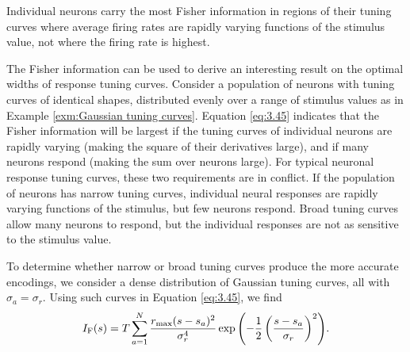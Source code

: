 \begin{rem}
  Individual neurons carry the most Fisher
information in regions of their tuning curves where average firing rates
are rapidly varying functions of the stimulus value, not where the firing
rate is highest.
\end{rem}
\begin{rem}
   The Fisher information can be used to derive an interesting result on the
optimal widths of response tuning curves. Consider a population of neurons with tuning curves of identical shapes, distributed evenly over a
range of stimulus values as in Example \ref{exm:Gaussian tuning curves}. Equation \ref{eq:3.45} indicates that the
Fisher information will be largest if the tuning curves of individual neurons are rapidly varying (making the square of their derivatives large), and
if many neurons respond (making the sum over neurons large). For typical neuronal response tuning curves, these two requirements are in conflict.
If the population of neurons has narrow tuning curves,
individual neural responses are rapidly varying functions of the stimulus,
but few neurons respond. Broad tuning curves allow many neurons to
respond, but the individual responses are not as sensitive to the stimulus
value.
\end{rem}
\begin{exm}
  To determine whether narrow or broad tuning curves produce the
more accurate encodings, we consider a dense distribution of Gaussian
tuning curves, all with $\sigma_a=\sigma_{r}$. Using such curves in
Equation \ref{eq:3.45}, we find
\begin{equation}
  \label{eq:3.46}
  I_{\rm{F}}(s)=T\sum\limits_{a=1}\limits^N
  {\frac{r_{\max}(s-s_{a})^{2}}{\sigma_r^{4}}\exp \left( -\frac{1}{2}\left( \frac{s-s_{a}}{\sigma_{r}} \right)^{2} \right)}.
\end{equation}
\end{exm}

